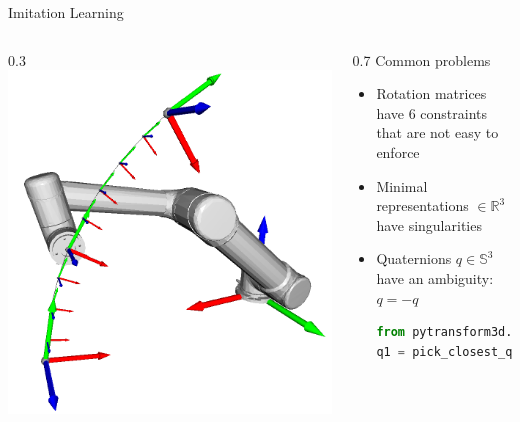 \documentclass[14pt]{beamer}
\begin{document}
\begin{frame}[fragile]{Imitation Learning}
\begin{columns}
\begin{column}{0.3\textwidth}
\includegraphics[width=\textwidth]{images/movement_primitives_cart_dmp_ur5}
\end{column}
\begin{column}{0.7\textwidth}
Common problems
\begin{itemize}
\item Rotation matrices have 6 constraints that are not easy to enforce
\item Minimal representations $\in \mathbb{R}^3$ have singularities
\item Quaternions $q \in \mathbb{S}^3$ have an ambiguity: $q = -q$
\begin{lstlisting}[language=Python]
from pytransform3d.rotations import pick_closest_quaternion
q1 = pick_closest_quaternion(q1, q2)
\end{lstlisting}
\parencite{Ude2014}
\end{itemize}
\end{column}
\end{columns}
\end{frame}
\end{document}
